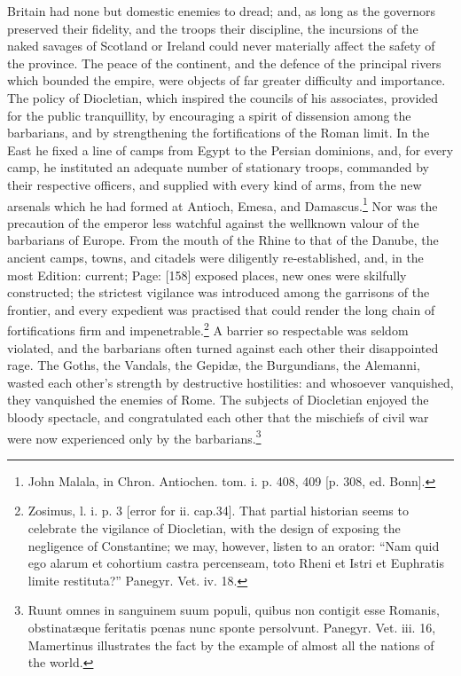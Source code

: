 Britain had none but domestic enemies to dread; and, as long as the governors preserved their fidelity, and the troops their discipline, the incursions of the naked savages of Scotland or Ireland could never materially affect the safety of the province. The peace of the continent, and the defence of the principal rivers which bounded the empire, were objects of far greater difficulty and importance. The policy of Diocletian, which inspired the councils of his associates, provided for the public tranquillity, by encouraging a spirit of dissension among the barbarians, and by strengthening the fortifications of the Roman limit. In the East he fixed a line of camps from Egypt to the Persian dominions, and, for every camp, he instituted an adequate number of stationary troops, commanded by their respective officers, and supplied with every kind of arms, from the new arsenals which he had formed at Antioch, Emesa, and Damascus.\footnote{John Malala, in Chron. Antiochen. tom. i. p. 408, 409 [p. 308, ed. Bonn].} Nor was the precaution of the emperor less watchful against the wellknown valour of the barbarians of Europe. From the mouth of the Rhine to that of the Danube, the ancient camps, towns, and citadels were diligently re-established, and, in the most Edition: current; Page: [158] exposed places, new ones were skilfully constructed; the strictest vigilance was introduced among the garrisons of the frontier, and every expedient was practised that could render the long chain of fortifications firm and impenetrable.\footnote{Zosimus, l. i. p. 3 [error for ii. cap.34]. That partial historian seems to celebrate the vigilance of Diocletian, with the design of exposing the negligence of Constantine; we may, however, listen to an orator: \texthebrew{“}Nam quid ego alarum et cohortium castra percenseam, toto Rheni et Istri et Euphratis limite restituta?\texthebrew{}” Panegyr. Vet. iv. 18.} A barrier so respectable was seldom violated, and the barbarians often turned against each other their disappointed rage. The Goths, the Vandals, the Gepidæ, the Burgundians, the Alemanni, wasted each other\texthebrew{}’s strength by destructive hostilities: and whosoever vanquished, they vanquished the enemies of Rome. The subjects of Diocletian enjoyed the bloody spectacle, and congratulated each other that the mischiefs of civil war were now experienced only by the barbarians.\footnote{Ruunt omnes in sanguinem suum populi, quibus non contigit esse Romanis, obstinatæque feritatis pœnas nunc sponte persolvunt. Panegyr. Vet. iii. 16, Mamertinus illustrates the fact by the example of almost all the nations of the world.}

